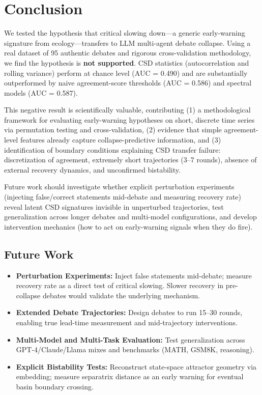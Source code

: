 \documentclass[11pt,letterpaper]{article}
\begin{document}
\section{Conclusion}

We tested the hypothesis that critical slowing down---a generic early-warning signature from ecology---transfers to LLM multi-agent debate collapse. Using a real dataset of 95 authentic debates and rigorous cross-validation methodology, we find the hypothesis is \textbf{not supported}. CSD statistics (autocorrelation and rolling variance) perform at chance level (AUC = 0.490) and are substantially outperformed by naive agreement-score thresholds (AUC = 0.586) and spectral models (AUC = 0.587).

This negative result is scientifically valuable, contributing (1) a methodological framework for evaluating early-warning hypotheses on short, discrete time series via permutation testing and cross-validation, (2) evidence that simple agreement-level features already capture collapse-predictive information, and (3) identification of boundary conditions explaining CSD transfer failure: discretization of agreement, extremely short trajectories (3--7 rounds), absence of external recovery dynamics, and unconfirmed bistability.

Future work should investigate whether explicit perturbation experiments (injecting false/correct statements mid-debate and measuring recovery rate) reveal latent CSD signatures invisible in unperturbed trajectories, test generalization across longer debates and multi-model configurations, and develop intervention mechanics (how to act on early-warning signals when they do fire).

\subsection{Future Work}

\begin{itemize}
\item \textbf{Perturbation Experiments:} Inject false statements mid-debate; measure recovery rate as a direct test of critical slowing. Slower recovery in pre-collapse debates would validate the underlying mechanism.
\item \textbf{Extended Debate Trajectories:} Design debates to run 15--30 rounds, enabling true lead-time measurement and mid-trajectory interventions.
\item \textbf{Multi-Model and Multi-Task Evaluation:} Test generalization across GPT-4/Claude/Llama mixes and benchmarks (MATH, GSM8K, reasoning).
\item \textbf{Explicit Bistability Tests:} Reconstruct state-space attractor geometry via embedding; measure separatrix distance as an early warning for eventual basin boundary crossing.
\end{itemize}



\end{document}
